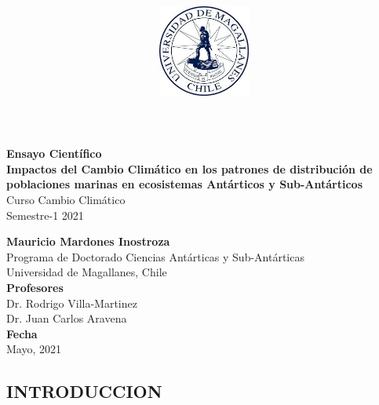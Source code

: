 \documentclass[
]{article}
\title{\includegraphics[width=3cm,height=\textheight]{logoUMAG.jpg}}
\author{}
\date{\vspace{-2.5em}}
\begin{document}
\maketitle



\begin{flushleft}
\Large{\textbf{Ensayo Científico}}\\
\vspace*{2\baselineskip}
\LARGE{\textbf{Impactos del Cambio Climático en los patrones de distribución de poblaciones marinas en ecosistemas Antárticos y Sub-Antárticos}}\\
\vspace*{5\baselineskip}
\Large{Curso Cambio Climático}\\
\Large{Semestre-1 2021 }\\
\vspace*{4\baselineskip}
\end{flushleft}
\begin{flushright}
\large{\textbf{Mauricio Mardones Inostroza}}\\
\vspace*{2\baselineskip}
\normalsize{Programa de Doctorado Ciencias Antárticas y Sub-Antárticas}\\
\vspace*{1\baselineskip}
\normalsize{Universidad de Magallanes, Chile}\\
\vspace*{2\baselineskip}
\normalsize{\textbf{Profesores}}\\
Dr. Rodrigo Villa-Martinez\\
Dr. Juan Carlos Aravena\\
\vspace*{1\baselineskip}
\normalsize{\textbf{Fecha}}\\
Mayo, 2021
\end{flushright}



\hypersetup{linkcolor = black}
\newpage
{}

\newpage



\hypersetup{linkcolor = blue}

\fontsize{12}{26}
\selectfont{}

\hypertarget{introduccion}{%
\subsection{INTRODUCCION}\label{introduccion}}
\end{document}
